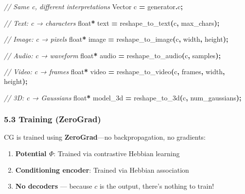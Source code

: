\documentclass[
  11pt,
  a4paper,
]{article}
\newenvironment{Shaded}{\begin{snugshade}}{\end{snugshade}}
\newcommand{\CommentTok}[1]{\textcolor[rgb]{0.56,0.35,0.01}{\textit{#1}}}
\newcommand{\DataTypeTok}[1]{\textcolor[rgb]{0.13,0.29,0.53}{#1}}
\newcommand{\NormalTok}[1]{#1}
\newcommand{\OperatorTok}[1]{\textcolor[rgb]{0.81,0.36,0.00}{\textbf{#1}}}
\providecommand{\tightlist}{%
  \setlength{\itemsep}{0pt}\setlength{\parskip}{0pt}}
\begin{document}
\begin{Shaded}
\begin{Highlighting}[]
\CommentTok{// Same c, different interpretations}
\NormalTok{Vector c }\OperatorTok{=}\NormalTok{ generator}\OperatorTok{.}\NormalTok{c}\OperatorTok{;}

\CommentTok{// Text: c → characters}
\DataTypeTok{float}\OperatorTok{*}\NormalTok{ text }\OperatorTok{=}\NormalTok{ reshape\_to\_text}\OperatorTok{(}\NormalTok{c}\OperatorTok{,}\NormalTok{ max\_chars}\OperatorTok{);}

\CommentTok{// Image: c → pixels}
\DataTypeTok{float}\OperatorTok{*}\NormalTok{ image }\OperatorTok{=}\NormalTok{ reshape\_to\_image}\OperatorTok{(}\NormalTok{c}\OperatorTok{,}\NormalTok{ width}\OperatorTok{,}\NormalTok{ height}\OperatorTok{);}

\CommentTok{// Audio: c → waveform}
\DataTypeTok{float}\OperatorTok{*}\NormalTok{ audio }\OperatorTok{=}\NormalTok{ reshape\_to\_audio}\OperatorTok{(}\NormalTok{c}\OperatorTok{,}\NormalTok{ samples}\OperatorTok{);}

\CommentTok{// Video: c → frames}
\DataTypeTok{float}\OperatorTok{*}\NormalTok{ video }\OperatorTok{=}\NormalTok{ reshape\_to\_video}\OperatorTok{(}\NormalTok{c}\OperatorTok{,}\NormalTok{ frames}\OperatorTok{,}\NormalTok{ width}\OperatorTok{,}\NormalTok{ height}\OperatorTok{);}

\CommentTok{// 3D: c → Gaussians}
\DataTypeTok{float}\OperatorTok{*}\NormalTok{ model\_3d }\OperatorTok{=}\NormalTok{ reshape\_to\_3d}\OperatorTok{(}\NormalTok{c}\OperatorTok{,}\NormalTok{ num\_gaussians}\OperatorTok{);}
\end{Highlighting}
\end{Shaded}

\subsubsection{5.3 Training (ZeroGrad)}\label{training-zerograd}

CG is trained using \textbf{ZeroGrad}---no backpropagation, no
gradients:

\begin{enumerate}
\def\labelenumi{\arabic{enumi}.}
\tightlist
\item
  \textbf{Potential \(\Phi\)}: Trained via contrastive Hebbian learning
\item
  \textbf{Conditioning encoder}: Trained via Hebbian association
\item
  \textbf{No decoders} --- because \(c\) is the output, there's nothing
  to train!
\end{enumerate}
\end{document}

